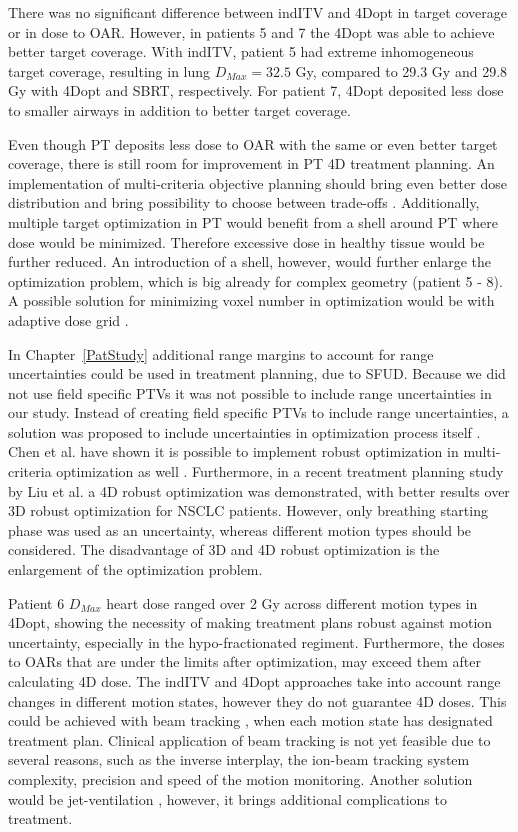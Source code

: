 There was no significant difference between indITV and 4Dopt in target coverage or in dose to OAR. 
However, in patients 5 and 7 the 4Dopt was able to achieve better target coverage. With indITV, patient 5 had extreme inhomogeneous target coverage, resulting in lung $D_{Max} = 32.5$ Gy,
compared to 29.3 Gy and 29.8 Gy with 4Dopt and SBRT, respectively. For patient 7, 4Dopt deposited less dose to smaller airways in addition to better target coverage.

Even though PT deposits less dose to OAR with the same or even better target coverage, there is still room for improvement in PT 4D treatment planning. 
An implementation of multi-criteria objective planning should bring even better dose distribution and bring possibility to choose between trade-offs \cite{Breedveld2007, Chen2010}. 
Additionally, multiple target optimization in PT would benefit from a shell around PT where dose would be minimized. Therefore excessive dose
in healthy tissue would be further reduced. An introduction of a shell, however, would further enlarge the optimization problem, which is big already for complex geometry (patient 5 - 8). 
A possible solution for minimizing voxel number in optimization would be with adaptive dose grid \cite{Prall2016a}.

In Chapter~\ref{PatStudy} additional range margins to account for range uncertainties could be used in treatment planning, due to SFUD. 
Because we did not use field specific PTVs it was not possible to include range uncertainties in our study.
Instead of creating field specific PTVs to include range uncertainties, a solution was proposed to include uncertainties in optimization process itself \cite{Pflugfelder2008, Unkelbach2009, Fredriksson2011, Chen2012}.
Chen et al. have shown it is possible to implement robust optimization in multi-criteria optimization as well \cite{Chen2012}. Furthermore, in a recent treatment planning study by Liu et al. \cite{Liu2016}
a 4D robust optimization was demonstrated, with better results over 3D robust optimization for NSCLC patients. However, only breathing starting phase was used as an uncertainty,
whereas different motion types should be considered. The disadvantage of 3D and 4D robust optimization is the enlargement of the optimization problem.

Patient 6 $D_{Max}$ heart dose ranged over 2 Gy across different motion types in 4Dopt, showing the necessity of making treatment plans robust against motion uncertainty, 
especially in the hypo-fractionated regiment. Furthermore, the doses to OARs that are under the limits after optimization, may exceed them after calculating 4D dose. 
The indITV and 4Dopt approaches take into account range changes in different motion states, however they do not guarantee 4D doses. This could be achieved with beam tracking \cite{Bert2007}, 
when each motion state has designated treatment plan. Clinical application of beam tracking is not yet feasible due to several reasons, such as the 
inverse interplay, the ion-beam tracking system complexity, precision and speed of the motion monitoring.
Another solution would be jet-ventilation \cite{Santiago2013}, however, it brings additional complications to treatment.

